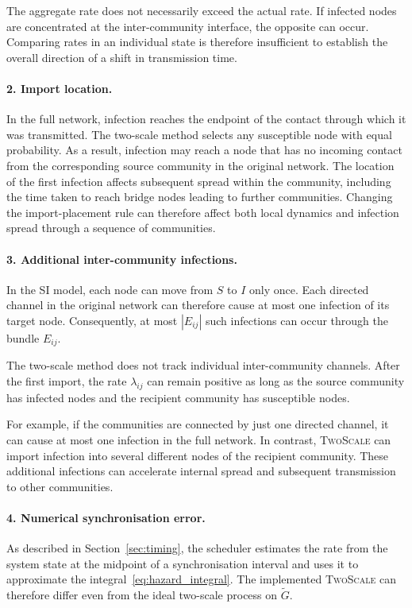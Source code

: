 \documentclass[a4paper,fleqn]{cas-sc}
\newcommand{\TS}{\textup{\textsc{TwoScale}}}
\begin{document}
The aggregate rate does not necessarily exceed the actual rate. If infected nodes are concentrated at the inter-community interface, the opposite can occur. Comparing rates in an individual state is therefore insufficient to establish the overall direction of a shift in transmission time.

\paragraph{2. Import location.}
In the full network, infection reaches the endpoint of the contact through which it was transmitted. The two-scale method selects any susceptible node with equal probability.
As a result, infection may reach a node that has no incoming contact from the corresponding source community in the original network. The location of the first infection affects subsequent spread within the community, including the time taken to reach bridge nodes leading to further communities. Changing the import-placement rule can therefore affect both local dynamics and infection spread through a sequence of communities.

\paragraph{3. Additional inter-community infections.}
In the SI model, each node can move from $S$ to $I$ only once. Each directed channel in the original network can therefore cause at most one infection of its target node. Consequently, at most $|E_{ij}|$ such infections can occur through the bundle $E_{ij}$.

The two-scale method does not track individual inter-community channels. After the first import, the rate $\lambda_{ij}$ can remain positive as long as the source community has infected nodes and the recipient community has susceptible nodes.

For example, if the communities are connected by just one directed channel, it can cause at most one infection in the full network. In contrast, \TS{} can import infection into several different nodes of the recipient community. These additional infections can accelerate internal spread and subsequent transmission to other communities.

\paragraph{4. Numerical synchronisation error.}
As described in Section~\ref{sec:timing}, the scheduler estimates the rate from the system state at the midpoint of a synchronisation interval and uses it to approximate the integral~\eqref{eq:hazard_integral}. The implemented \TS{} can therefore differ even from the ideal two-scale process on $\tilde G$.
\end{document}

